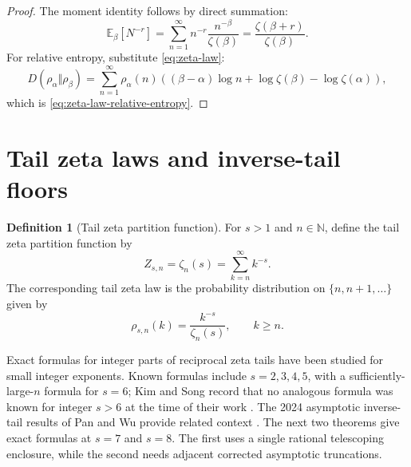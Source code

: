 \documentclass[11pt]{article}
\numberwithin{equation}{section}
\theoremstyle{definition}
\newtheorem{definition}[theorem]{Definition}
\theoremstyle{remark}
\newcommand{\E}{\mathbb E}
\newcommand{\N}{\mathbb N}
\newcommand{\1}{\mathbf 1}
\begin{document}
\begin{proof}
The moment identity follows by direct summation:
\begin{equation}
\label{eq:zeta-law-moment-proof}
\E_\beta[N^{-r}]
=\sum_{n=1}^{\infty}n^{-r}\frac{n^{-\beta}}{\zeta(\beta)}
=\frac{\zeta(\beta+r)}{\zeta(\beta)}.
\end{equation}
For relative entropy, substitute \eqref{eq:zeta-law}:
\begin{equation}
\label{eq:zeta-law-relative-entropy-proof}
D(\rho_\alpha\Vert\rho_\beta)
=\sum_{n=1}^{\infty}\rho_\alpha(n)
\left((\beta-\alpha)\log n+\log\zeta(\beta)-\log\zeta(\alpha)\right),
\end{equation}
which is \eqref{eq:zeta-law-relative-entropy}.
\end{proof}

\section{Tail zeta laws and inverse-tail floors}

\begin{definition}[Tail zeta partition function]
\label{def:tail-zeta-partition}
For \(s>1\) and \(n\in\N\), define the tail zeta partition function by
\begin{equation}
\label{eq:tail-zeta-partition}
Z_{s,n}=\zeta_n(s)=\sum_{k=n}^{\infty}k^{-s}.
\end{equation}
The corresponding tail zeta law is the probability distribution on \(\{n,n+1,\ldots\}\) given by
\begin{equation}
\label{eq:tail-zeta-law}
\rho_{s,n}(k)=\frac{k^{-s}}{\zeta_n(s)},\qquad k\ge n.
\end{equation}
\end{definition}

Exact formulas for integer parts of reciprocal zeta tails have been studied for small integer exponents.  Known formulas include \(s=2,3,4,5\), with a sufficiently-large-\(n\) formula for \(s=6\); Kim and Song record that no analogous formula was known for integer \(s>6\) at the time of their work \cite{kim-song-tail}.  The 2024 asymptotic inverse-tail results of Pan and Wu provide related context \cite{pan-wu-tail}.  The next two theorems give exact formulas at \(s=7\) and \(s=8\).  The first uses a single rational telescoping enclosure, while the second needs adjacent corrected asymptotic truncations.
\end{document}
